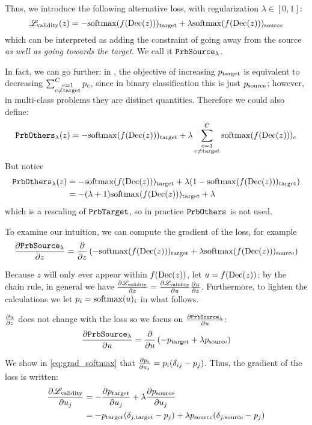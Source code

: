 \documentclass[../main.tex]{subfiles}
\begin{document}
Thus, we introduce the following alternative loss, with regularization $\lambda \in [0, 1]$:
\begin{equation}
    \mathscr{L}_\text{validity}(z) = -\mathrm{softmax}(f(\operatorname{Dec}(z)))_{\mathrm{target}}
+ \lambda \mathrm{softmax}(f(\operatorname{Dec}(z)))_{\mathrm{source}}
\end{equation}
which can be interpreted as adding the constraint of going away from the source \emph{as well as going towards the target}.
We call it $\mathtt{PrbSource}_{\lambda}$.

In fact, we can go further:
in \ls{}, the objective of increasing $p_{\mathrm{target}}$ is equivalent to decreasing $\sum_{\substack{{c}=1 \\ {c} \neq \mathrm{target}}}^C p_c$, since in binary classification this is just $p_{\mathrm{source}}$; however, in multi-class problems they are distinct quantities.
Therefore we could also define:
\begin{align*}
    \mathtt{PrbOthers}_{\lambda}(z) = - \mathrm{softmax}(f(\operatorname{Dec}(z)))_{\mathrm{target}} + \lambda \sum_{\substack{{c}=1 \\ {c} \neq \mathrm{target}}}^C \mathrm{softmax}(f(\operatorname{Dec}(z)))_c
\end{align*}
But notice
\begin{align*}
    \mathtt{PrbOthers}_{\lambda}(z)
     & = - \mathrm{softmax}(f(\operatorname{Dec}(z)))_{\mathrm{target}} + \lambda (1 - \mathrm{softmax}(f(\operatorname{Dec}(z)))_{\mathrm{target}}) \\
     & = -(\lambda + 1) \mathrm{softmax}(f(\operatorname{Dec}(z)))_{\mathrm{target}} + \lambda
\end{align*}
which is a rescaling of $\mathtt{PrbTarget}$, so in practice $\mathtt{PrbOthers}_{}$ is not used.

To examine our intuition, we can compute the gradient of the loss, for example
\begin{align*}
\frac{\partial \mathtt{PrbSource}_{\lambda}}{\partial z}
=  \frac{\partial }{\partial z} \left( - \mathrm{softmax}(f(\operatorname{Dec}(z)))_{\mathrm{target}} + \lambda \mathrm{softmax}(f(\operatorname{Dec}(z)))_{\mathrm{source}} \right)
\end{align*}

Because $z$ will only ever appear within $f(\operatorname{Dec}(z))$, let $u = f(\operatorname{Dec}(z))$; by the chain rule, in general we have $\frac{\partial \mathscr{L}_\text{validity}}{\partial z} = \frac{\partial \mathscr{L}_\text{validity}}{\partial u} \frac{\partial u}{\partial z}$.
Furthermore, to lighten the calculations we let $p_i = \mathrm{softmax}(u)_i$ in what follows.

$\frac{\partial u}{\partial z}$ does not change with the loss so we focus on $\frac{\partial \mathtt{PrbSource}_{\lambda}}{\partial u}$:
\begin{align*}
\frac{\partial \mathtt{PrbSource}_{\lambda}}{\partial u}
=  \frac{\partial }{\partial u} \left( - p_{\mathrm{target}} + \lambda p_{\mathrm{source}} \right)
\end{align*}

We show in \autoref{eq:grad_softmax} that $\frac{\partial p_i}{\partial u_j} = p_i ( \delta_{ij}  -  p_j)$.
Thus, the gradient of the loss is written:
\begin{align*}
    \frac{\partial \mathscr{L}_\text{validity}}{\partial u_j}
=  - & \frac{\partial p_{\mathrm{target}} }{\partial u_j} + \lambda \frac{\partial p_{\mathrm{source}}}{\partial u_j}  \\
=  - & p_{\mathrm{target}} (\delta_{j, \mathrm{target}} - p_j) + \lambda p_{\mathrm{source}} (\delta_{j, \mathrm{source}} - p_j)
\end{align*}
\end{document}
